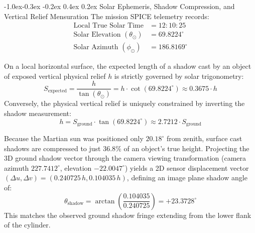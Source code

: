 \documentclass[11pt,a4paper]{article}
\makeatletter
\renewcommand\subsection{\@startsection{subsection}{2}{\z@}%
                                     {-1.0ex\@plus -0.3ex \@minus -0.2ex}%
                                     {0.4ex \@plus 0.2ex}%
                                     {\normalfont\normalsize\bfseries}}
\makeatother
\begin{document}
\subsection{Solar Ephemeris, Shadow Compression, and Vertical Relief Mensuration}
The mission SPICE telemetry records:
\begin{align*}
	\text{Local True Solar Time}           & = 12:10:25       \\
	\text{Solar Elevation } (\theta_\odot) & = 69.8224^\circ  \\
	\text{Solar Azimuth } (\phi_\odot)     & = 186.8169^\circ
\end{align*}

On a local horizontal surface, the expected length of a shadow cast by an object of exposed vertical physical relief $h$ is strictly governed by solar trigonometry:
\begin{equation}
	S_{\text{expected}} = \frac{h}{\tan(\theta_\odot)} = h \cdot \cot(69.8224^\circ) \approx 0.3675 \cdot h
\end{equation}
Conversely, the physical vertical relief is uniquely constrained by inverting the shadow measurement:
\begin{equation}
	h = S_{\text{ground}} \cdot \tan(69.8224^\circ) \approx 2.7212 \cdot S_{\text{ground}}
\end{equation}

Because the Martian sun was positioned only $20.18^\circ$ from zenith, surface cast shadows are compressed to just $36.8\%$ of an object's true height. Projecting the 3D ground shadow vector through the camera viewing transformation (camera azimuth $227.7412^\circ$, elevation $-22.0047^\circ$) yields a 2D sensor displacement vector $(\Delta u, \Delta v) = (0.240725\,h, 0.104035\,h)$, defining an image plane shadow angle of:
\begin{equation}
	\theta_{\text{shadow}} = \arctan\left(\frac{0.104035}{0.240725}\right) = +23.3728^\circ
\end{equation}
This matches the observed ground shadow fringe extending from the lower flank of the cylinder.
\end{document}
